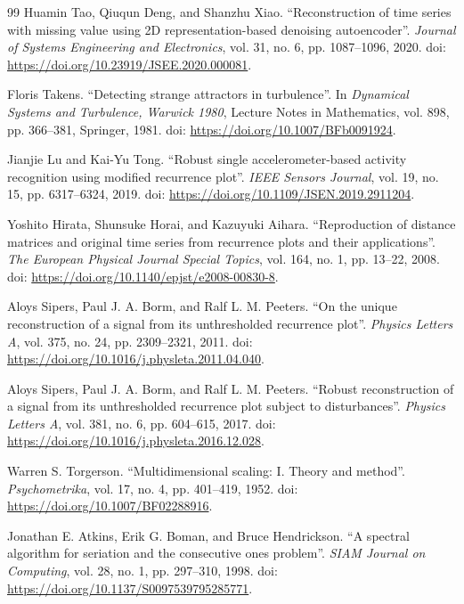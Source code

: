 \documentclass[preprint,12pt]{elsarticle}
\begin{document}
{\begin{thebibliography}{99}
Huamin Tao, Qiuqun Deng, and Shanzhu Xiao. ``Reconstruction of time series with missing value using 2D representation-based denoising autoencoder''. \textit{Journal of Systems Engineering and Electronics}, vol. 31, no. 6, pp. 1087--1096, 2020. doi: \url{https://doi.org/10.23919/JSEE.2020.000081}.

Floris Takens. ``Detecting strange attractors in turbulence''. In \textit{Dynamical Systems and Turbulence, Warwick 1980}, Lecture Notes in Mathematics, vol. 898, pp. 366--381, Springer, 1981. doi: \url{https://doi.org/10.1007/BFb0091924}.

Jianjie Lu and Kai-Yu Tong. ``Robust single accelerometer-based activity recognition using modified recurrence plot''. \textit{IEEE Sensors Journal}, vol. 19, no. 15, pp. 6317--6324, 2019. doi: \url{https://doi.org/10.1109/JSEN.2019.2911204}.

Yoshito Hirata, Shunsuke Horai, and Kazuyuki Aihara. ``Reproduction of distance matrices and original time series from recurrence plots and their applications''. \textit{The European Physical Journal Special Topics}, vol. 164, no. 1, pp. 13--22, 2008. doi: \url{https://doi.org/10.1140/epjst/e2008-00830-8}.

Aloys Sipers, Paul J. A. Borm, and Ralf L. M. Peeters. ``On the unique reconstruction of a signal from its unthresholded recurrence plot''. \textit{Physics Letters A}, vol. 375, no. 24, pp. 2309--2321, 2011. doi: \url{https://doi.org/10.1016/j.physleta.2011.04.040}.

Aloys Sipers, Paul J. A. Borm, and Ralf L. M. Peeters. ``Robust reconstruction of a signal from its unthresholded recurrence plot subject to disturbances''. \textit{Physics Letters A}, vol. 381, no. 6, pp. 604--615, 2017. doi: \url{https://doi.org/10.1016/j.physleta.2016.12.028}.

Warren S. Torgerson. ``Multidimensional scaling: I. Theory and method''. \textit{Psychometrika}, vol. 17, no. 4, pp. 401--419, 1952. doi: \url{https://doi.org/10.1007/BF02288916}.

Jonathan E. Atkins, Erik G. Boman, and Bruce Hendrickson. ``A spectral algorithm for seriation and the consecutive ones problem''. \textit{SIAM Journal on Computing}, vol. 28, no. 1, pp. 297--310, 1998. doi: \url{https://doi.org/10.1137/S0097539795285771}.


\end{thebibliography}}
\end{document}

